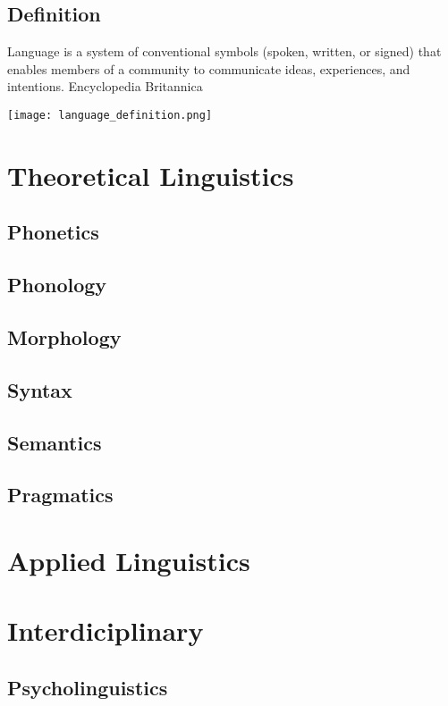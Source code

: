 




\tableofcontents
\cite{busoniu-2008-a-comprehensive-survey-of-multi-agent-reinforcement-learning}

\section{Definition}
    Language is a system of conventional symbols (spoken, written, or signed) that enables members of a community to communicate ideas, experiences, and intentions.
    Encyclopedia Britannica
    
    \texttt{[image: language\_definition.png]}


\chapter{Theoretical Linguistics}
    \section{Phonetics}
    \section{Phonology}
    \section{Morphology}
    \section{Syntax}
    \section{Semantics}
    \section{Pragmatics}
\chapter{Applied Linguistics}
\chapter{Interdiciplinary}
    \section{Psycholinguistics}
